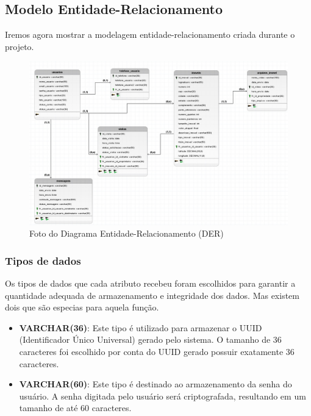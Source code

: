 \subsection{Modelo Entidade-Relacionamento}

Iremos agora mostrar a modelagem entidade-relacionamento criada durante o projeto.

\newpage
\begin{figure}[h!] 
    \centering
      \includegraphics[width=\textwidth]{./img/Logico.jpeg}
    \caption{Foto do Diagrama Entidade-Relacionamento (DER)}
    \label{fig:exemplo-imagem}
\end{figure}


\subsubsection{Tipos de dados}

Os tipos de dados que cada atributo recebeu foram escolhidos para garantir a quantidade adequada de armazenamento e integridade dos dados. Mas existem dois que são especias para aquela função.

\begin{itemize} 
    \item \textbf{VARCHAR(36)}: Este tipo é utilizado para armazenar o UUID (Identificador Único Universal) gerado pelo sistema. O tamanho de 36 caracteres foi escolhido por conta do UUID gerado possuir exatamente 36 caracteres.
    \item \textbf{VARCHAR(60)}: Este tipo é destinado ao armazenamento da senha do usuário. A senha digitada pelo usuário será criptografada, resultando em um tamanho de até 60 caracteres. 


\end{itemize}



